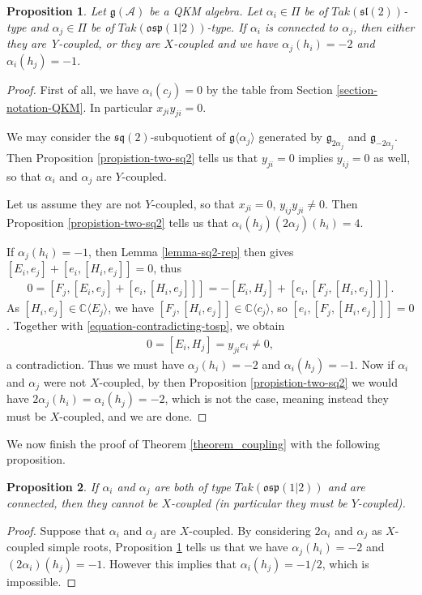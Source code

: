 \documentclass[12pt, a4paper, reqno]{amsart}
\def\p{\mathfrak{p}}
\def\q{\mathfrak{q}}
\def\g{\mathfrak{g}}
\def\l{\mathfrak{l}}
\def\s{\mathfrak{s}}
\def\o{\mathfrak{o}}
\newtheorem{proposition}{Proposition}
\theoremstyle{definition}
\theoremstyle{definition}
\theoremstyle{definition}
\numberwithin{theorem}{section}
\numberwithin{lemma}{section}
\numberwithin{remark}{section}
\numberwithin{definition}{section}
\numberwithin{corollary}{section}
\numberwithin{proposition}{section}
\numberwithin{example}{section}
\begin{document}
	\begin{proposition}\label{prop_coupling_sl_osp}
		Let \(\mathfrak{g}(\mathcal{A})\) be a QKM algebra. Let \(\alpha_i \in \Pi\) be of $Tak(\s\l(2))$-type and \(\alpha_j \in \Pi\) be of $Tak(\mathfrak{osp}(1|2))$-type. If $\alpha_i$ is connected to $\alpha_j$, then either they are Y-coupled, or they are $X$-coupled and we have $\alpha_j(h_i)=-2$ and $\alpha_i(h_j)=-1$.
	\end{proposition}
	
	\begin{proof}
		First of all, we have \(\alpha_i(c_j) = 0\) by the table from Section \ref{section-notation-QKM}.  In particular $x_{ji}y_{ji}=0$.
		
		We may consider the \(\s\q(2)\)-subquotient of $\g\langle\alpha_j\rangle$ generated by $\g_{2\alpha_j}$ and $\g_{-2\alpha_j}$.  Then Proposition \ref{propistion-two-sq2} tells us that $y_{ji}=0$ implies $y_{ij}=0$ as well, so that $\alpha_i$ and $\alpha_j$ are $Y$-coupled.  
		
		Let us assume they are not $Y$-coupled, so that $x_{ji}=0$, $y_{ij}y_{ji}\neq0$.  Then Proposition \ref{propistion-two-sq2} tells us that $\alpha_i(h_j)(2\alpha_j)(h_i)=4$.  
		
		If $\alpha_j(h_i)=-1$, then Lemma \ref{lemma-sq2-rep} then gives \([E_i,e_j] + [e_i,[H_i,e_j]] = 0\), thus
		\begin{align}\label{equation-contradicting-tosp}
			0 = [F_j,[E_i,e_j] + [e_i,[H_i,e_j]]] = -[E_i,H_j] + [e_i,[F_j,[H_i,e_j]]].
		\end{align} 
		As \([H_i,e_j] \in \mathbb{C}\langle E_j\rangle\), we have \([F_j,[H_i,e_j]] \in \mathbb{C}\langle c_j\rangle \), so \([e_i,[F_j,[H_i,e_j]]] = 0\). Together with \eqref{equation-contradicting-tosp}, we obtain
		\begin{align*}
			0 = [E_i,H_j] = y_{ji}e_i \neq 0,
		\end{align*}
		a contradiction. Thus we must have $\alpha_j(h_i)=-2$ and $\alpha_i(h_j)=-1$.  Now if $\alpha_i$ and $\alpha_j$ were not $X$-coupled, by then Proposition \ref{propistion-two-sq2} we would have $2\alpha_j(h_i)=\alpha_i(h_j)=-2$, which is not the case, meaning instead they must be $X$-coupled, and we are done.
	\end{proof}
	
	We now finish the proof of Theorem \ref{theorem_coupling} with the following proposition.
	\begin{proposition}
		If $\alpha_i$ and $\alpha_j$ are both of type $Tak(\o\s\p(1|2))$ and are connected, then they cannot be $X$-coupled (in particular they must be $Y$-coupled).
	\end{proposition}
	\begin{proof}
		Suppose that $\alpha_i$ and $\alpha_j$ are $X$-coupled.   By considering $2\alpha_i$ and $\alpha_j$ as $X$-coupled simple roots, Proposition \ref{prop_coupling_sl_osp} tells us that we have $\alpha_j(h_i)=-2$ and $(2\alpha_i)(h_j)=-1$. However this implies that $\alpha_i(h_j)=-1/2$, which is impossible.
	\end{proof}
	
\end{document}
